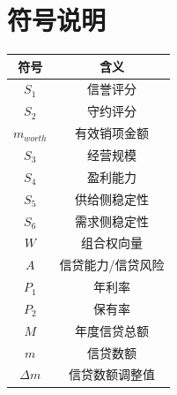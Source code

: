 \ifx\allfiles\undefined


\else
\fi


\part{符号说明}

\begin{table}[htbp]
	\begin{center}
		\begin{tabular}{cc}
			\hline%
			\textbf{符号}   & \textbf{含义}    \\
			\hline
			$ S_1 $           & 信誉评分        \\
			$ S_2 $           & 守约评分            \\
			$ m_{worth} $     & 有效销项金额      \\
			$ S_3 $     & 经营规模      \\
			$ S_4 $       & 盈利能力            \\
			$ S_5 $       & 供给侧稳定性            \\
			$ S_6 $ & 需求侧稳定性          \\
			$ W $           & 组合权向量         \\
			$ A $        & 信贷能力/信贷风险       \\
			$ P_1 $        & 年利率    \\
			$ P_2 $     & 保有率         \\
			$ M $           & 年度信贷总额                \\
			$ m $           & 信贷数额        \\
			$ \Delta m $     & 信贷数额调整值      \\
			\hline
		\end{tabular}
	\end{center}
\end{table}
\newpage


\ifx\allfiles\undefined

\fi